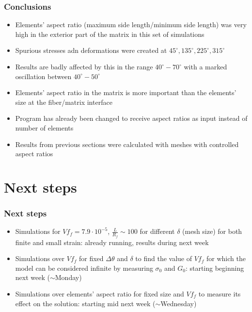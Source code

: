 \documentclass[first,firstsupp,lastsupp,handout,last,hyperref,table]{ETHclass}
\begin{document}
\begin{frame}
\frametitle{\small Conclusions}
\vspace{-0.5cm}
\centering
\begin{itemize}[label=]
\item Elements' aspect ratio (maximum side length/minimum side length) was very high in the exterior part of the matrix in this set of simulations
\item Spurious stresses adn deformations were created at $45^{\circ},135^{\circ},225^{\circ},315^{\circ}$
\item Results are badly affected by this in the range  $40^{\circ} - 70^{\circ}$ with a marked oscillation between $40^{\circ} - 50^{\circ}$
\item Elements' aspect ratio in the matrix is more important than the elements' size at the fiber/matrix interface
\item Program has already been changed to receive aspect ratios as input instead of number of elements
\item Results from previous sections were calculated with meshes with controlled aspect ratios
\end{itemize}
\end{frame}

\section{Next steps}

\begin{frame}
\frametitle{\small Next steps}
\vspace{-0.5cm}
\centering
\begin{itemize}[label=]
\item Simulations for $Vf_{f}=7.9\cdot 10^{-5}$, $\frac{L}{R_{f}}\sim 100$ for different $\delta$ (mesh size) for both finite and small strain: already running, results during next week
\item Simulations over $Vf_{f}$ for fixed $\Delta\theta$ and $\delta$ to find the value of $Vf_{f}$ for which the model can be considered infinite by measuring $\sigma_{0}$ and $G_{0}$: starting beginning next week ($\sim$Monday)
\item Simulations over elements' aspect ratio for fixed size and $Vf_{f}$ to measure its effect on the solution: starting mid next week ($\sim$Wednesday)
\end{itemize}
\end{frame}
\end{document}
